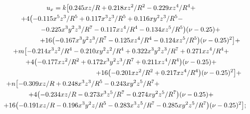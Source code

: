 \begin{multline}\label{eq:ulg:ppr1}

u_x=k

\bigl[

0.245 x z/R +0.218 x z^2/R^2-0.229x z^4/R^4+

\\

+

4 \bigl(-0.115 x^5 z^3/R^5+0.117 x^3 z^3/R^5+0.116x y^2 z^3/R^5 - \hspace{2cm}

\\

\hspace{1cm}

 -0.225 x^3 y^2 z^3/R^7-0.117 x z^4/R^4-0.134 x z^5/R^5\bigr)(\nu -0.25)+

\\

\hspace{2cm}

 +

16\bigl(-0.167 x^3 y^2 z^3/R^7-0.125 x z^4/R^4-0.124x z^5/R^5\bigr) (\nu -0.25)^2\bigr]+

\\ 

+m \bigl[-0.214x^3 z^2/R^4-0.210 x y^2 z^2/R^4+0.322x^3 y^2 z^3/R^7+0.271x z^4/R^4+ \\

+4 \bigl(-0.177 x z^2/R^2+0.172 x^3 y^2 z^3/R^7+0.211 x z^4/R^4 \bigr) (\nu -0.25) +

\\ 

\hspace{5cm} +16 \bigl(-0.201x z^2/R^2+0.217x z^4/R^4\bigr) (\nu -0.25)^2\bigr]+

\\ 

+n\bigl[-0.309 x z/R+0.248 x^3 z^3/R^5-0.243 x y^2 z^5/R^7+\hspace{4cm}\\

+4\bigl(-0.234x z/R-0.273x^3 z^5/R^7-0.274 x y^2 z^5/R^7\bigr) (\nu -0.25)+

\\

\hspace{.4cm}

+16\bigl(-0.191 x z/R -0.196 x^3 y^2 z/R^5-0.283x^3 z^5/R^7-0.285x y^2 z^5/R^7\bigr) (\nu-0.25 )^2

\bigr];

\end{multline}



